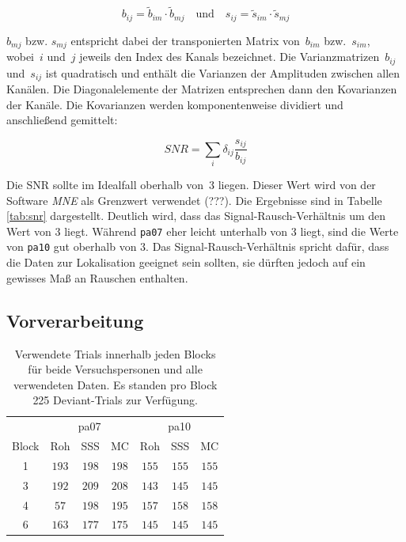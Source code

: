 \documentclass[doc,a4paper,12pt]{apa6}
\renewcommand{\arraystretch}{1.2}
\begin{document}
\begin{equation}
b_{ij} = \tilde{b}_{im} \cdot \tilde{b}_{mj} \quad \text{und} \quad s_{ij} = \tilde{s}_{im} \cdot \tilde{s}_{mj}
\end{equation}

$b_{mj}$ bzw. $s_{mj}$ entspricht dabei der transponierten Matrix von~$b_{im}$ bzw.~$s_{im}$, wobei~$i$ und~$j$ jeweils den Index des Kanals bezeichnet. Die Varianzmatrizen~$b_{ij}$ und~$s_{ij}$ ist quadratisch und enthält die Varianzen der Amplituden zwischen allen Kanälen. Die Diagonalelemente der Matrizen entsprechen dann den Kovarianzen der Kanäle. Die Kovarianzen werden komponentenweise dividiert und anschließend gemittelt:

\begin{equation}
SNR = \sum_i \delta_{ij} \frac{s_{ij}}{b_{ij}}
\end{equation}

Die SNR sollte im Idealfall oberhalb von~$3$ liegen. Dieser Wert wird von der Software \emph{MNE} als Grenzwert verwendet (???). Die Ergebnisse sind in Tabelle \ref{tab:snr} dargestellt. Deutlich wird, dass das Signal-Rausch-Verhältnis um den Wert von $3$ liegt. Während \texttt{pa07} eher leicht unterhalb von $3$ liegt, sind die Werte von \texttt{pa10} gut oberhalb von $3$. Das Signal-Rausch-Verhältnis spricht dafür, dass die Daten zur Lokalisation geeignet sein sollten, sie dürften jedoch auf ein gewisses Maß an Rauschen enthalten.


\subsection{Vorverarbeitung}
\label{sec:ergebnis-vorverarbeitung}

\begin{table}
  \caption{}
  \label{tab:rejecting}
  \vspace*{3mm}
  \centering
  \setlength{\tabcolsep}{7mm}
  \renewcommand{\arraystretch}{1.5}
  \begin{tabular}{ccccccc}
  \hline
  & \multicolumn{3}{c}{pa07} & \multicolumn{3}{c}{pa10}\\
  Block & Roh & SSS & MC & Roh & SSS & MC \\
  \hline
  1 & $193$ & $198$ & $198$ & $155$ & $155$ & $155$\\
  3 & $192$ & $209$ & $208$ & $143$ & $145$ & $145$\\
  4 & $57$ & $198$ & $195$ & $157$ & $158$ & $158$\\
  6 & $163$ & $177$ & $175$ & $145$ & $145$ & $145$\\
  \hline
  \end{tabular}
  \vspace*{3mm}
  \caption*{Verwendete Trials innerhalb jeden Blocks für beide Versuchspersonen und alle verwendeten Daten. Es standen pro Block 225 Deviant-Trials zur Verfügung.}
\end{table}
\end{document}

